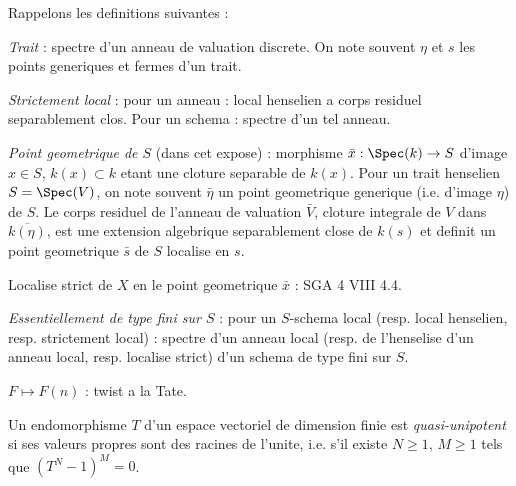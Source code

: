 Rappelons les definitions suivantes :

\begin{definition}[Trait]
\label{def:trait}
\emph{Trait} : spectre d'un anneau de valuation discrete. On note souvent $\eta$ et $s$ les points generiques et fermes d'un trait.
\end{definition}

\begin{definition}
\label{def:strictement-local}
\emph{Strictement local} : pour un anneau : local henselien a corps residuel separablement clos. Pour un schema : spectre d'un tel anneau.
\end{definition}

\begin{definition}
\label{def:point-geometrique}
\emph{Point geometrique de $S$} (dans cet expose) : morphisme $\bar{x}: \Spec(k) \to S$ d'image $x \in S$, $k(x) \subset k$ etant une cloture separable de $k(x)$. Pour un trait henselien $S = \Spec(V)$, on note souvent $\bar{\eta}$ un point geometrique generique (i.e. d'image $\eta$) de $S$. Le corps residuel de l'anneau de valuation $\bar{V}$, cloture integrale de $V$ dans $\overline{k(\eta)}$, est une extension algebrique separablement close de $k(s)$ et definit un point geometrique $\bar{s}$ de $S$ localise en $s$.
\end{definition}

\begin{definition}
\label{def:localise-strict}
Localise strict de $X$ en le point geometrique $\bar{x}$ : SGA 4 VIII 4.4.
\end{definition}

\begin{definition}
\label{def:essentiellement-tf}
\emph{Essentiellement de type fini sur $S$} : pour un $S$-schema local (resp. local henselien, resp. strictement local) : spectre d'un anneau local (resp. de l'henselise d'un anneau local, resp. localise strict) d'un schema de type fini sur $S$.
\end{definition}

\begin{definition}
\label{def:tate-twist}
$F \mapsto F(n)$ : twist a la Tate.
\end{definition}

\begin{definition}
\label{def:quasi-unipotent}
Un endomorphisme $T$ d'un espace vectoriel de dimension finie est \emph{quasi-unipotent} si ses valeurs propres sont des racines de l'unite, i.e. s'il existe $N \geqslant 1$, $M \geqslant 1$ tels que $(T^N - 1)^M = 0$.
\end{definition}

